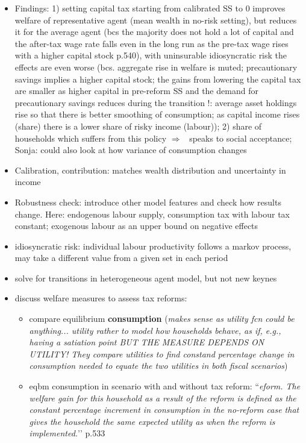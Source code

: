 \documentclass[12pt]{article}
\newcommand{\ar}{$\Rightarrow$ \ }
\begin{document}
\begin{itemize}
\item Findings: 1) setting capital tax starting from calibrated SS to 0 improves welfare of representative agent (mean wealth in no-risk setting), but reduces it for the average agent (bcs the majority does not hold a lot of capital and the after-tax wage rate falls even in the long run as the pre-tax wage rises with a higher capital stock p.540), with uninsurable idiosyncratic risk the effects are even worse (bcs. aggregate rise in welfare is muted; precautionary savings implies a higher capital stock; the gains from lowering the capital tax are smaller as higher capital in pre-reform SS and the demand for precautionary savings reduces during the transition !: average asset holdings rise so that there is better smoothing of consumption; as capital income rises (share) there is a lower share of risky income (labour)); 2) share of households which suffers from this policy \ar speaks to social acceptance; Sonja: could also look at how variance of consumption changes
\item Calibration, contribution: matches wealth distribution and uncertainty in income
\item Robustness check: introduce other model features and check how results change. Here: endogenous labour supply, consumption tax with labour tax constant; exogenous labour as an upper bound on negative effects
\item idiosyncratic risk: individual labour productivity follows a markov process, may take a different value from a given set in each period
\item solve for transitions in heterogeneous agent model, but not new keynes
\item discuss welfare measures to assess tax reforms:
\begin{itemize}
\item compare equilibrium \textbf{consumption} (\textit{makes sense as utility fcn could be anything... utility rather to model how households behave, as if, e.g., having a satiation point BUT THE MEASURE DEPENDS ON UTILITY! They compare utilities to find constand percentage change in consumption needed to equate the two utilities in both fiscal scenarios}) 
\item eqbm consumption in scenario with and without tax reform: ``\textit{eform. The welfare gain for this household as a result of the reform is defined
	as the constant percentage increment in consumption in the no-reform case that
	gives the household the same expected utility as when the reform is implemented.}’’ p.533

\end{itemize}
\end{itemize}
\end{document}
